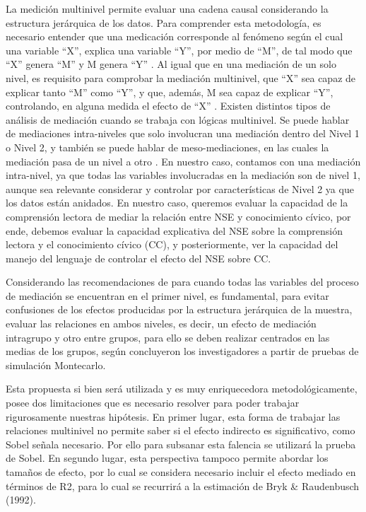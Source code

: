 \documentclass[12pt,twoside]{templates/facsothesis}
\begin{document}
La medición multinivel permite evaluar una cadena causal considerando la estructura jerárquica de los datos. Para comprender esta metodología, es necesario entender que una medicación corresponde al fenómeno según el cual una variable ``X'', explica una variable ``Y'', por medio de ``M'', de tal modo que ``X'' genera ``M'' y M genera ``Y'' \citep{mathieu_framework_2007}. Al igual que en una mediación de un solo nivel, es requisito para comprobar la mediación multinivel, que ``X'' sea capaz de explicar tanto ``M'' como ``Y'', y que, además, M sea capaz de explicar ``Y'', controlando, en alguna medida el efecto de ``X'' \citep{baron_moderator_1986}. Existen distintos tipos de análisis de mediación cuando se trabaja con lógicas multinivel. Se puede hablar de mediaciones intra-niveles que solo involucran una mediación dentro del Nivel 1 o Nivel 2, y también se puede hablar de meso-mediaciones, en las cuales la mediación pasa de un nivel a otro \citep{mathieu_framework_2007}. En nuestro caso, contamos con una mediación intra-nivel, ya que todas las variables involucradas en la mediación son de nivel 1, aunque sea relevante considerar y controlar por características de Nivel 2 ya que los datos están anidados. En nuestro caso, queremos evaluar la capacidad de la comprensión lectora de mediar la relación entre NSE y conocimiento cívico, por ende, debemos evaluar la capacidad explicativa del NSE sobre la comprensión lectora y el conocimiento cívico (CC), y posteriormente, ver la capacidad del manejo del lenguaje de controlar el efecto del NSE sobre CC.

Considerando las recomendaciones de \citep{zhang_Testing_2009} para cuando todas las variables del proceso de mediación se encuentran en el primer nivel, es fundamental, para evitar confusiones de los efectos producidas por la estructura jerárquica de la muestra, evaluar las relaciones en ambos niveles, es decir, un efecto de mediación intragrupo y otro entre grupos, para ello se deben realizar centrados en las medias de los grupos, según concluyeron los investigadores a partir de pruebas de simulación Montecarlo.

Esta propuesta si bien será utilizada y es muy enriquecedora metodológicamente, posee dos limitaciones que es necesario resolver para poder trabajar rigurosamente nuestras hipótesis. En primer lugar, esta forma de trabajar las relaciones multinivel no permite saber si el efecto indirecto es significativo, como Sobel señala necesario. Por ello para subsanar esta falencia se utilizará la prueba de Sobel. En segundo lugar, esta perspectiva tampoco permite abordar los tamaños de efecto, por lo cual se considera necesario incluir el efecto mediado en términos de R2, para lo cual se recurrirá a la estimación de Bryk \& Raudenbusch (1992).
\end{document}
